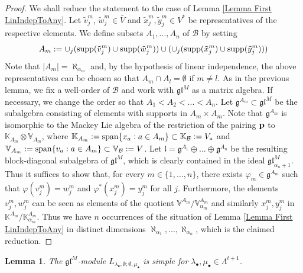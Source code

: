 \documentclass[12pt]{article}
\def\KK {{\mathbb K}}     %
\def\VV {{\mathbb V}}     %
\def\B  {\mathcal B}
\def\mk {\mathfrak}
\newtheorem{lemma}[theorem]{Lemma}
\begin{document}
\begin{proof}
We shall reduce the statement to the case of Lemma \ref{Lemma First LinIndepToAny}. Let $\tilde v^m_j$, $\tilde w^m_j\in\bar V$ and $\tilde x^m_j,\tilde y^m_j\in V^*$ be representatives of the respective elements. We define subsets $A_1,...,A_n$ of $\B$ by setting
$$
A_m:=\cup_j({\rm supp}(\tilde v^m_j)\cup{\rm supp}(\tilde w^m_j)) \cup (\cup_j({\rm supp}(\tilde x^m_j)\cup{\rm supp}(\tilde y^m_j)))
$$
Note that $|A_m|=\aleph_{\alpha_m}$ and, by the hypothesis of linear independence, the above representatives can be chosen so that $A_m\cap A_l=\emptyset$ if $m\ne l$. As in the previous lemma, we fix a well-order of $\B$ and work with $\mk{gl}^M$ as a matrix algebra. If necessary, we change the order so that $A_1<A_2<...<A_n$. Let $\mk g^{A_m}\subset\mk{gl}^M$ be the subalgebra consisting of elements with supports in $A_m\times A_m$. Note that $\mk g^{A_m}$ is isomorphic to the Mackey Lie algebra of the restriction of the pairing ${\bf p}$ to $\KK_{A_m}\otimes \VV_{A_m}$, where $\KK_{A_m}:={\rm span}\{x_a:a\in A_m\}\subset \KK_\B:=V_*$ and $\VV_{A_m}:={\rm span}\{v_a:a\in A_m\}\subset \VV_\B:=V$. Let $\mk l =\mk g^{A_1}\oplus...\oplus\mk g^{A_n}$ be the resulting block-diagonal subalgebra of $\mk{gl}^M$, which is clearly contained in the ideal $\mk{gl}^M_{\alpha_n+1}$. Thus it suffices to show that, for every $m\in\{1,...,n\}$, there exists $\varphi_m\in\mk g^{A_m}$ such that $\varphi(v^m_j)=w^m_j$ and $\varphi^*(x^m_j)=y^m_j$ for all $j$. Furthermore, the elements $v^m_j,w^m_j$ can be seen as elements of the quotient $\VV^{A_m}/\VV^{A_m}_{\alpha_m}$ and similarly $x^m_j,y^m_j$ in $\KK^{A_m}/\KK^{A_m}_{\alpha_m}$. Thus we have $n$ occurrences of the situation of Lemma \ref{Lemma First LinIndepToAny} in distinct dimensions $\aleph_{\alpha_1},...,\aleph_{\alpha_n}$, which is the claimed reduction.
\end{proof}


\begin{lemma}\label{Lemma simple lambda00mu}
The $\mk{gl}^M$-module $L_{\lambda_\bullet,\emptyset;\emptyset,\mu_\bullet}$ is simple for $\lambda_\bullet,\mu_\bullet\in\Lambda^{t+1}$.
\end{lemma}
\end{document}
